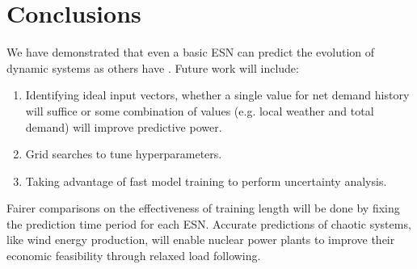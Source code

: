 \section{Conclusions}

We have demonstrated that even a basic \acrshort{ESN} can
predict the evolution of dynamic systems as others have
\cite{pathak_model-free_2018,wikner_combining_2020,bianchi_reservoir_2020}.
Future work will include:
\begin{enumerate}
  \item Identifying ideal input vectors, whether a single value for net demand
  history will suffice or some combination of values (e.g. local weather and
  total demand) will improve predictive power.
  \item Grid searches to tune hyperparameters.
  \item Taking advantage of fast model training to perform uncertainty analysis.
\end{enumerate}
Fairer comparisons on the effectiveness of training length will be done by
fixing the prediction time period for each ESN.
Accurate predictions of chaotic systems, like wind energy production, will
enable nuclear power plants to improve their economic feasibility through
relaxed load following.
